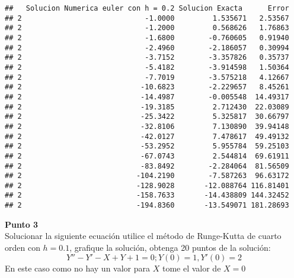\documentclass[]{article}
\begin{document}
\begin{verbatim}
##   Solucion Numerica euler con h = 0.2 Solucion Exacta      Error
## 2                             -1.0000         1.535671   2.53567
## 2                             -1.2000         0.568626   1.76863
## 2                             -1.6800        -0.760605   0.91940
## 2                             -2.4960        -2.186057   0.30994
## 2                             -3.7152        -3.357826   0.35737
## 2                             -5.4182        -3.914598   1.50364
## 2                             -7.7019        -3.575218   4.12667
## 2                            -10.6823        -2.229657   8.45261
## 2                            -14.4987        -0.005548  14.49317
## 2                            -19.3185         2.712430  22.03089
## 2                            -25.3422         5.325817  30.66797
## 2                            -32.8106         7.130890  39.94148
## 2                            -42.0127         7.478617  49.49132
## 2                            -53.2952         5.955784  59.25103
## 2                            -67.0743         2.544814  69.61911
## 2                            -83.8492        -2.284064  81.56509
## 2                           -104.2190        -7.587263  96.63172
## 2                           -128.9028       -12.088764 116.81401
## 2                           -158.7633       -14.438809 144.32452
## 2                           -194.8360       -13.549071 181.28693
\end{verbatim}

\textbf{Punto 3}\\[2\baselineskip]Solucionar la siguiente ecuación
utilice el método de Runge-Kutta de cuarto orden con \(h = 0.1\),
grafique la solución, obtenga 20 puntos de la solución: \[
Y''-Y'-X+Y+1=0; Y(0)=1, Y'(0)=2
\] En este caso como no hay un valor para \(X\) tome el valor de \(X=0\)
\end{document}
